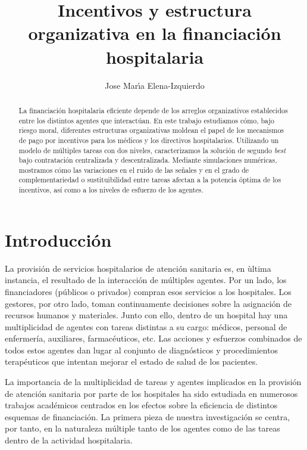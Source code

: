 ﻿\documentclass[12pt,letterpaper]{article}
\begin{document}
\title{\textbf{Incentivos y estructura organizativa en la financiaci\'on hospitalaria}\\{\small \textbf{}}}
\author{Jose Mar\'\i a Elena-Izquierdo}
\date{}
\maketitle

\begin{abstract}
La financiaci\'on hospitalaria eficiente depende de los arreglos organizativos establecidos entre los distintos agentes que interact\'uan. En este trabajo estudiamos c\'omo, bajo riesgo moral, diferentes estructuras organizativas moldean el papel de los mecanismos de pago por incentivos para los m\'edicos y los directivos hospitalarios. Utilizando un modelo de m\'ultiples tareas con dos niveles, caracterizamos la soluci\'on de segundo \emph{best} bajo contrataci\'on centralizada y descentralizada. Mediante simulaciones num\'ericas, mostramos c\'omo las variaciones en el ruido de las se\~nales y en el grado de complementariedad o sustituibilidad entre tareas afectan a la potencia \^optima de los incentivos, as\'i como a los niveles de esfuerzo de los agentes.
\end{abstract}

\section*{Introducci\'on}
La provisi\'on de servicios hospitalarios de atenci\'on sanitaria es, en \`ultima instancia, el resultado de la interacci\'on de m\'ultiples agentes. Por un lado, los financiadores (p\'ublicos o privados) compran esos servicios a los hospitales. Los gestores, por otro lado, toman continuamente decisiones sobre la asignaci\'on de recursos humanos y materiales. Junto con ello, dentro de un hospital hay una multiplicidad de agentes con tareas distintas a su cargo: m\'edicos, personal de enfermer\'ia, auxiliares, farmac\'euticos, etc. Las acciones y esfuerzos combinados de todos estos agentes dan lugar al conjunto de diagn\'osticos y procedimientos terap\'euticos que intentan mejorar el estado de salud de los pacientes.

La importancia de la multiplicidad de tareas y agentes implicados en la provisi\'on de atenci\'on sanitaria por parte de los hospitales ha sido estudiada en numerosos trabajos acad\'emicos centrados en los efectos sobre la eficiencia de distintos esquemas de financiaci\'on. La primera pieza de nuestra investigaci\'on se centra, por tanto, en la naturaleza m\'ultiple tanto de los agentes como de las tareas dentro de la actividad hospitalaria.
\end{document}
